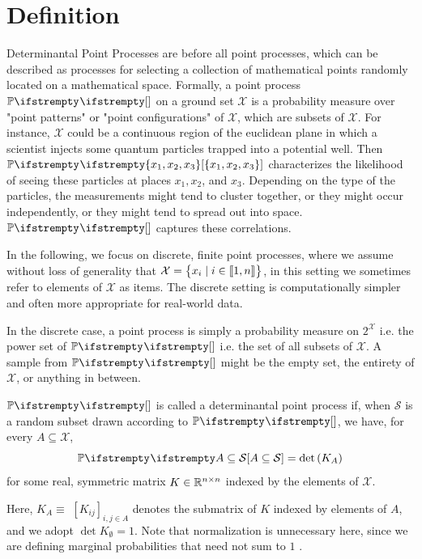 \section{Definition}
Determinantal Point Processes are before all point processes, which can be described as processes for selecting a collection of mathematical points randomly located on a mathematical space. Formally, a point process $\PP{}{}$ on a ground set $\mathcal{X}$ is a probability measure over "point patterns" or "point configurations" of $\mathcal{X}$, which are subsets of $\mathcal{X}$. For instance, $\mathcal{X}$ could be a continuous region of the euclidean plane in which a scientist injects some quantum particles trapped into a potential well. Then $\PP{}{\left\{x_1, x_2, x_3\right\}}$ characterizes the likelihood of seeing these particles at places $x_1, x_2$, and $x_3$. Depending on the type of the particles, the measurements might tend to cluster together, or they might occur independently, or they might tend to spread out into space. $\PP{}{}$ captures these correlations.

In the following, we focus on discrete, finite point processes, where we assume without loss of generality that $\mathcal{X}=\begin{Bmatrix}
    x_{i} \mid i\in \llbracket 1,n \rrbracket
    \end{Bmatrix}$, in this setting we sometimes refer to elements of $\mathcal{X}$ as items. The discrete setting is computationally simpler and often more appropriate for real-world data.

In the discrete case, a point process is simply a probability measure on $2^{\mathcal X}$ i.e. the power set of $\PP{}{}$ i.e. the set of all subsets of $\mathcal{X}$. A sample from $\PP{}{}$ might be the empty set, the entirety of $\mathcal{X}$, or anything in between. 
\begin{definition}
    \label{def_dpp}
    $\PP{}{}$ is called a determinantal point process if, when $\mathcal{S}$ is a random subset drawn according to $\PP{}{}$, we have, for every $A \subseteq \mathcal{X}$,
    \begin{equation}
        \PP{}{A \subseteq \mathcal{S}}=\operatorname{det}\left(K_A\right)
    \end{equation}
    for some real, symmetric matrix $K \in \mathbb{R}^{n \times n}$ indexed by the elements of $\mathcal{X}$.
\end{definition}
Here, $K_A \equiv$ $\left[K_{i j}\right]_{i, j \in A}$ denotes the submatrix of $K$ indexed by elements of $A$, and we adopt $\operatorname{det}K_\emptyset=1$. Note that normalization is unnecessary here, since we are defining marginal probabilities that need not sum to $1$ .

